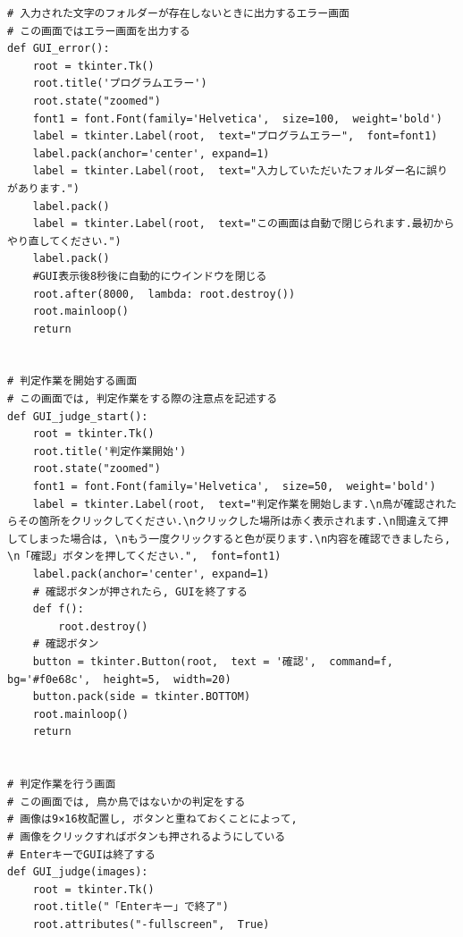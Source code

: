 \documentclass[dvipdfmx]{jsarticle}
\begin{document}
\begin{lstlisting}
# 入力された文字のフォルダーが存在しないときに出力するエラー画面
# この画面ではエラー画面を出力する
def GUI_error():
    root = tkinter.Tk()
    root.title('プログラムエラー')
    root.state("zoomed")
    font1 = font.Font(family='Helvetica',  size=100,  weight='bold')
    label = tkinter.Label(root,  text="プログラムエラー",  font=font1)
    label.pack(anchor='center', expand=1)
    label = tkinter.Label(root,  text="入力していただいたフォルダー名に誤りがあります.")
    label.pack()
    label = tkinter.Label(root,  text="この画面は自動で閉じられます.最初からやり直してください.")
    label.pack()
    #GUI表示後8秒後に自動的にウインドウを閉じる
    root.after(8000,  lambda: root.destroy()) 
    root.mainloop()
    return 


# 判定作業を開始する画面
# この画面では, 判定作業をする際の注意点を記述する
def GUI_judge_start():
    root = tkinter.Tk()
    root.title('判定作業開始')
    root.state("zoomed")
    font1 = font.Font(family='Helvetica',  size=50,  weight='bold')
    label = tkinter.Label(root,  text="判定作業を開始します.\n鳥が確認されたらその箇所をクリックしてください.\nクリックした場所は赤く表示されます.\n間違えて押してしまった場合は, \nもう一度クリックすると色が戻ります.\n内容を確認できましたら, \n「確認」ボタンを押してください.",  font=font1)
    label.pack(anchor='center', expand=1)
    # 確認ボタンが押されたら, GUIを終了する
    def f():
        root.destroy()
    # 確認ボタン
    button = tkinter.Button(root,  text = '確認',  command=f,  bg='#f0e68c',  height=5,  width=20)
    button.pack(side = tkinter.BOTTOM)
    root.mainloop()
    return


# 判定作業を行う画面
# この画面では, 鳥か鳥ではないかの判定をする
# 画像は9×16枚配置し, ボタンと重ねておくことによって, 
# 画像をクリックすればボタンも押されるようにしている
# EnterキーでGUIは終了する
def GUI_judge(images):
    root = tkinter.Tk()
    root.title("「Enterキー」で終了")
    root.attributes("-fullscreen",  True)


\end{lstlisting}
\end{document}
